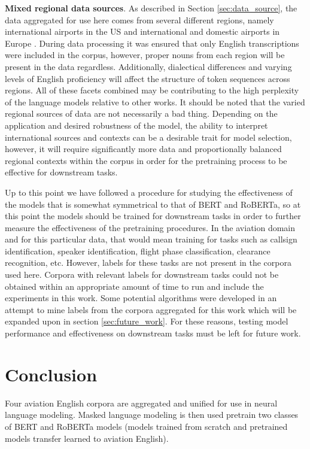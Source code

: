 \documentclass[12pt]{article}
\begin{document}
\textbf{Mixed regional data sources}. As described in Section \ref{sec:data_source}, the data aggregated for use here comes from several different
regions, namely international airports in the US \cite{godfrey_air_1994} and international and domestic airports in Europe
\cite{smidl_air_2019,hofbauer_atcosim_2008,szoke_detecting_2021}. During data processing it was ensured that only English transcriptions were included
in the corpus, however, proper nouns from each region will be present in the data regardless. Additionally, dialectical differences and varying levels
of English proficiency will affect the structure of token sequences across regions. All of these facets combined may be contributing to the high
perplexity of the language models relative to other works. It should be noted that the varied regional sources of data are not necessarily a bad
thing. Depending on the application and desired robustness of the model, the ability to interpret international sources and contexts can be a
desirable trait for model selection, however, it will require significantly more data and proportionally balanced regional contexts within the corpus
in order for the pretraining process to be effective for downstream tasks.

Up to this point we have followed a procedure for studying the effectiveness of the models that is somewhat symmetrical to that of BERT and RoBERTa,
so at this point the models should be trained for downstream tasks in order to further measure the effectiveness of the pretraining procedures.
In the aviation domain and for this particular data, that would mean training for tasks such as callsign identification, speaker identification,
flight phase classification, clearance recognition, etc. However, labels for these tasks are not present in the corpora used here. Corpora with
relevant labels for downstream tasks could not be obtained within an appropriate amount of time to run and include the experiments in this work.
Some potential algorithms were developed in an attempt to mine labels from the corpora aggregated for this work which will be expanded upon in section
\ref{sec:future_work}. For these reasons, testing model performance and effectiveness on downstream tasks must be left for future work.

\section{Conclusion}\label{sec:conclusion}
Four aviation English corpora are aggregated and unified for use in neural language modeling. Masked language modeling is then used pretrain two
classes of BERT and RoBERTa models (models trained from scratch and pretrained models transfer learned to aviation English).
\end{document}
